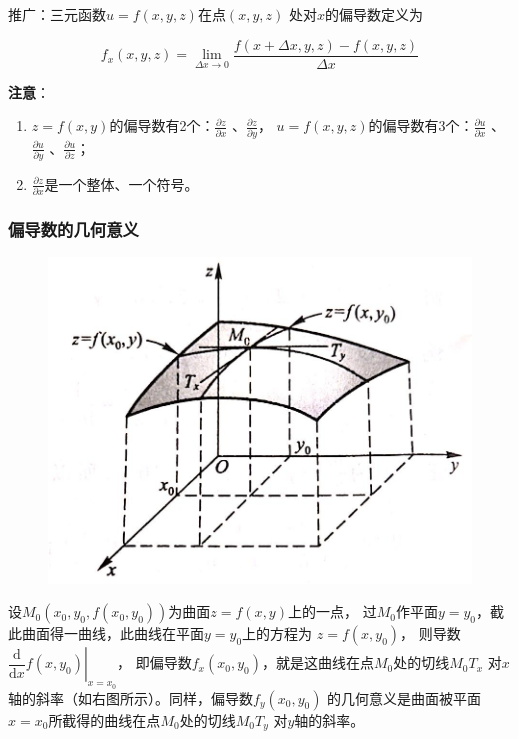\documentclass[12pt, a4paper]{article}
\numberwithin{equation}{section}
\newcommand{\rmd}{\mathrm{d}}
\newcommand{\pderiv}[2]{\frac{\partial #1}{\partial #2}}
\begin{document}
    推广：三元函数\(u=f\left(x,y,z\right)\)在点\(\left(x,y,z\right)\)
    处对\(x\)的偏导数定义为

    \begin{equation}
        f_x(x, y, z)=\lim _{\Delta x \rightarrow 0} \frac{f(x+\Delta x, y, z)-f(x, y, z)}{\Delta x}
    \end{equation}

    \textbf{注意}：

    \begin{enumerate}
        \item \(z=f\left(x,y\right)\)的偏导数有2个：\(\pderiv{z}{x}\) 、\(\pderiv{z}{y}\)，
            \(u=f\left(x,y,z\right)\)的偏导数有3个：\(\pderiv{u}{x}\) 、\(\pderiv{u}{y}\) 、\(\pderiv{u}{z}\)；
        \item \(\pderiv{z}{x}\)是一个整体、一个符号。
    \end{enumerate}


\subsubsection{偏导数的几何意义}

    \begin{figure}
        \centering
        \includegraphics[scale=0.15]{"Chapter 09 images/pic3.jpg"}
        \label{pic9-3}
    \end{figure}

    设\(M_0\left(x_0,y_0,f\left(x_0,y_0\right)\right)\)为曲面\(z=f\left(x,y\right)\)上的一点，
    过\(M_0\)作平面\(y=y_0\)，截此曲面得一曲线，此曲线在平面\(y=y_0\)上的方程为
    \(z=f\left(x,y_0\right)\)，
    则导数\(\left.\dfrac{\rmd}{\rmd x} f\left(x,y_0\right)\right|_{x=x_0}\)，
    即偏导数\(f_x\left(x_0,y_0\right)\)，就是这曲线在点\(M_0\)处的切线\(M_0T_x\)
    对\(x\)轴的斜率（如右图所示）。同样，偏导数\(f_y\left(x_0,y_0\right)\)
    的几何意义是曲面被平面\(x=x_0\)所截得的曲线在点\(M_0\)处的切线\(M_0T_y\)
    对\(y\)轴的斜率。
    \vspace{1em}
\end{document}
